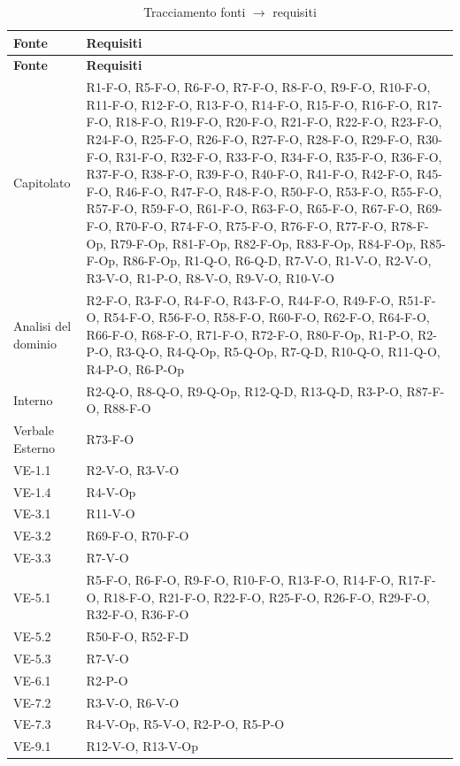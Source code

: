 \begin{longtable}{|p{2.8cm}|p{10.2cm}|}
	\caption{Tracciamento fonti $\rightarrow$ requisiti} \\
	\hline
	\rowcolor{primarycolor!10}
	\textbf{Fonte} & \textbf{Requisiti} \\
	\hline
	\endfirsthead
	\hline
	\rowcolor{primarycolor!10}
	\textbf{Fonte} & \textbf{Requisiti} \\
	\hline
	\endhead

	Capitolato &
		R1-F-O, R5-F-O, R6-F-O, R7-F-O, R8-F-O,
		R9-F-O, R10-F-O, R11-F-O, R12-F-O,
		R13-F-O, R14-F-O, R15-F-O, R16-F-O,
		R17-F-O, R18-F-O, R19-F-O, R20-F-O,
		R21-F-O, R22-F-O, R23-F-O, R24-F-O,
		R25-F-O, R26-F-O, R27-F-O, R28-F-O,
		R29-F-O, R30-F-O, R31-F-O, R32-F-O,
		R33-F-O, R34-F-O, R35-F-O, R36-F-O,
		R37-F-O, R38-F-O, R39-F-O, R40-F-O,
		R41-F-O, R42-F-O, R45-F-O, R46-F-O,
		R47-F-O, R48-F-O, R50-F-O, R53-F-O,
		R55-F-O, R57-F-O, R59-F-O, R61-F-O,
		R63-F-O, R65-F-O, R67-F-O, R69-F-O,
		R70-F-O, R74-F-O, R75-F-O, R76-F-O,
		R77-F-O, R78-F-Op, R79-F-Op, R81-F-Op,
		R82-F-Op, R83-F-Op, R84-F-Op, R85-F-Op,
		R86-F-Op, R1-Q-O, R6-Q-D, R7-V-O,
		R1-V-O, R2-V-O, R3-V-O, R1-P-O,
		R8-V-O, R9-V-O, R10-V-O \\ \hline

	Analisi del dominio &
		R2-F-O, R3-F-O, R4-F-O, R43-F-O,
		R44-F-O, R49-F-O, R51-F-O, R54-F-O,
		R56-F-O, R58-F-O, R60-F-O, R62-F-O,
		R64-F-O, R66-F-O, R68-F-O, R71-F-O, 
		R72-F-O, R80-F-Op, R1-P-O, R2-P-O,
		R3-Q-O, R4-Q-Op, R5-Q-Op,
		R7-Q-D, R10-Q-O, R11-Q-O,
		R4-P-O, R6-P-Op \\ \hline

	Interno & R2-Q-O, R8-Q-O, R9-Q-Op,
		R12-Q-D, R13-Q-D, R3-P-O,
		R87-F-O, R88-F-O \\ \hline

	Verbale Esterno & R73-F-O \\ \hline
	VE-1.1 & R2-V-O, R3-V-O \\ \hline
	VE-1.4 & R4-V-Op \\ \hline
	VE-3.1 & R11-V-O \\ \hline
	VE-3.2 & R69-F-O, R70-F-O \\ \hline
	VE-3.3 & R7-V-O \\ \hline
	VE-5.1 &
		R5-F-O, R6-F-O, R9-F-O, R10-F-O,
		R13-F-O, R14-F-O, R17-F-O, R18-F-O,
		R21-F-O, R22-F-O, R25-F-O, R26-F-O,
		R29-F-O, R32-F-O, R36-F-O \\ \hline
	VE-5.2 & R50-F-O, R52-F-D \\ \hline
	VE-5.3 & R7-V-O \\ \hline
	VE-6.1 & R2-P-O \\ \hline
	VE-7.2 & R3-V-O, R6-V-O \\ \hline
	VE-7.3 & R4-V-Op, R5-V-O, R2-P-O, R5-P-O \\ \hline
	VE-9.1 & R12-V-O, R13-V-Op \\ \hline

\end{longtable}